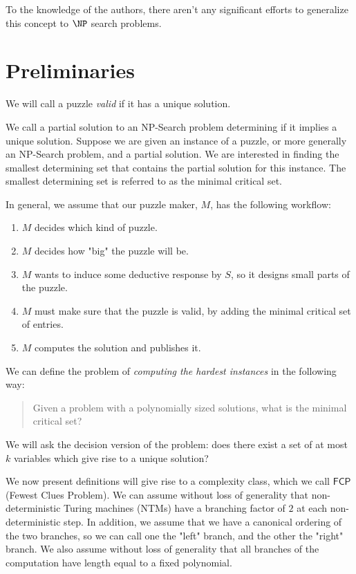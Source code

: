 \documentclass[runningheads,a4paper]{llncs}
\begin{document}
To the knowledge of the authors, there aren't any significant efforts to generalize this concept to $\NP$ search problems. 
 
\section{Preliminaries}
\label{sec:prelim}

\begin{definition}
We will call a puzzle \emph{valid} if it has a unique solution.
\end{definition}

\begin{definition}
We call a partial solution to an NP-Search problem determining if it implies a unique solution. Suppose we are given an instance of a puzzle, or more generally an NP-Search problem, and a partial solution. We are interested in finding the smallest determining set that contains the partial solution for this instance. The smallest determining set is referred to as the minimal critical set. 
\end{definition}

In general, we assume that our puzzle maker, $M$, has the following workflow:
\begin{enumerate}
\item $M$ decides which kind of puzzle.
\item $M$ decides how "big" the puzzle will be.
\item $M$ wants to induce some deductive response by $S$, so it designs small parts of the puzzle.
\item $M$ must make sure that the puzzle is valid, by adding the minimal critical set of entries.
\item $M$ computes the solution and publishes it. 
\end{enumerate}

We can define the problem of \emph{computing the hardest instances} in the following way: 

\begin{quote}
Given a problem with a polynomially sized solutions, what is the minimal critical set?
\end{quote}

We will ask the decision version of the problem: does there exist a set of at most $k$ variables which give rise to a unique solution?

We now present definitions will give rise to a complexity class, which we call  $\mathsf{FCP}$ (Fewest Clues Problem). We can assume without loss of generality that non-deterministic Turing machines (NTMs) have a branching factor of $2$ at each non-deterministic step. In addition, we assume that we have a canonical ordering of the two branches, so we can call one the "left" branch, and the other the "right" branch. We also assume without loss of generality that all branches of the computation have length equal to a fixed polynomial.
\end{document}
